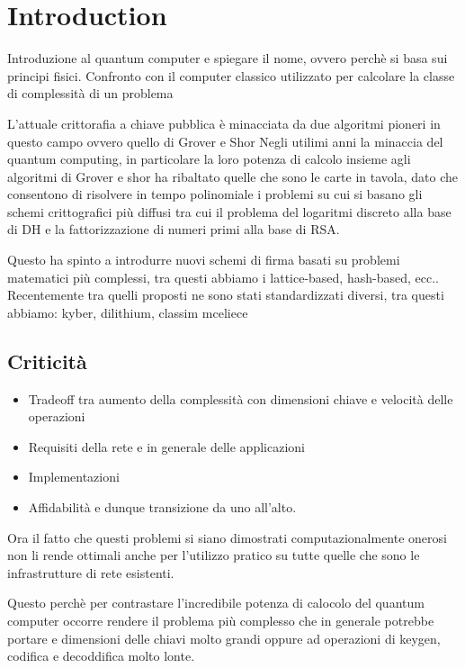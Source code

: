 
\chapter{Introduction} 

\label{introduction}  

Introduzione al quantum computer e spiegare il nome, ovvero perchè si basa sui principi fisici.
Confronto con il computer classico utilizzato per calcolare la classe di complessità di un problema

L'attuale crittorafia a chiave pubblica è minacciata da due algoritmi pioneri in questo campo ovvero quello di Grover e Shor
Negli utilimi anni la minaccia del quantum computing, in particolare la loro potenza di calcolo
insieme agli algoritmi di Grover e shor ha 
ribaltato quelle che sono le carte in tavola, dato che consentono di risolvere in tempo
polinomiale i problemi su cui si basano gli schemi crittografici più diffusi 
tra cui il problema del logaritmi discreto alla base di DH e la fattorizzazione di numeri 
primi alla base di RSA.

Questo ha spinto a introdurre nuovi schemi di firma basati su problemi matematici più complessi, 
tra questi abbiamo i lattice-based, hash-based, ecc..
Recentemente tra quelli proposti ne sono stati standardizzati diversi, tra questi abbiamo:
kyber, dilithium, classim mceliece 

\section*{Criticità}

\begin{itemize}
	\item Tradeoff tra aumento della complessità con dimensioni chiave e velocità delle operazioni
	\item Requisiti della rete e in generale delle applicazioni
	\item Implementazioni 
	\item Affidabilità e dunque transizione da uno all'alto.
\end{itemize}


Ora il fatto che questi problemi si siano dimostrati computazionalmente onerosi non li rende 
ottimali anche per l'utilizzo pratico su tutte quelle che sono le infrastrutture di rete esistenti.

Questo perchè per contrastare l'incredibile potenza di calocolo del quantum computer occorre 
rendere il problema più complesso che in generale potrebbe portare e dimensioni delle chiavi molto 
grandi oppure ad operazioni di keygen, codifica e decoddifica molto lonte.

